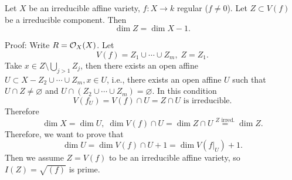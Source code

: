 \begin{dang}
\begin{theorem}\label{theorem: dim of irreducible component of V(f)}
    Let $X$ be an irreducible affine variety, $f:X\to k$ regular ($f\neq0$). Let 
    $Z\subset V(f)$ be a irreducible component. Then 
    \begin{equation}
        \dim Z = \dim X -1.
    \end{equation}
\end{theorem}
\end{dang}
Proof: Write $R=\mathcal{O}_X(X)$. Let 
\begin{equation}
    V(f)=Z_1\cup\cdots\cup Z_m,\; Z=Z_1.
\end{equation}
Take $x\in Z\setminus \bigcup_{j>1}Z_j$, then there exists an open affine $U\subset X-Z_2\cup\cdots\cup Z_m, x\in U$, i.e., 
there exists an open affine $U$ such that $U\cap Z\neq\varnothing$ and 
$U\cap (Z_2\cup\cdots\cup Z_m)=\varnothing$. In this condition 
\begin{equation}
   V(f_U)= V(f)\cap U = Z\cap U\text{ is irreducible}.
\end{equation}
Therefore 
\begin{equation}
    \dim X = \dim U,\; \dim V(f)\cap U=\dim Z\cap U\overset{Z\text{ irred.}}{=}\dim Z.
\end{equation}
Therefore, we want to prove that 
\begin{equation}
    \dim U = \dim V(f)\cap U+1 = \dim V(f|_U) +1.
\end{equation}
Then we assume $Z=V(f)$ to be an irreducible affine variety, so $I(Z)=\sqrt{(f)}$ is prime.\par 

